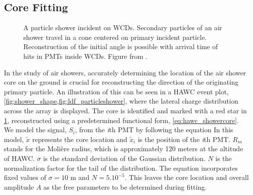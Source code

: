 \subsection{Core Fitting} \label{sec:hawc_core_fitting}

\begin{figure}[h!]
    \caption{A particle shower incident on WCDs. Secondary particles of an air shower travel in a cone centered on primary incident particle. Reconstruction of the initial angle is possible with arrival time of hits in PMTs inside WCDs. Figure from \cite{thesis_Zigg}.}
    \label{fig:shower_shape}
\end{figure}

In the study of air showers, accurately determining the location of the air shower core on the ground is crucial for reconstructing the direction of the originating primary particle.
An illustration of this can be seen in a HAWC event plot, \cref{fig:shower_shape,fig:ldf_particleshower}, where the lateral charge distribution across the array is displayed.
The core is identified and marked with a red star in \cref{fig:shower_shape}, reconstructed using a predetermined functional form, \cref{eq:hawc_showercore}.
We model the signal, $S_i$, from the \textit{i}th PMT by following the equation
\showercore
In this model, $\tilde{x}$ represents the core location and $\tilde{x}_i$ is the position of the \textit{i}th PMT.
$R_m$ stands for the Molière radius, which is approximately 120 meters at the altitude of HAWC.
$\sigma$ is the standard deviation of the Gaussian distribution.
$N$ is the normalization factor for the tail of the distribution.
The equation incorporates fixed values of $\sigma = 10$ m and $N=5.10^{-5}$.
This leaves the core location and overall amplitude $A$ as the free parameters to be determined during fitting.

